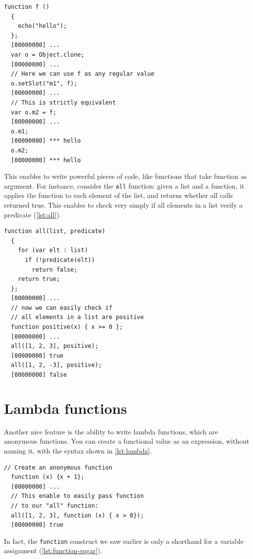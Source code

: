 \documentclass[openright,twoside,12pt]{report}
\newcommand{\lst}[1]{\autoref{lst:#1}}
\begin{document}
\begin{lstlisting}[caption=First class functions,
  label=lst:first-class-functions]
  function f ()
  {
    echo("hello");
  };
  [00000000] ...
  var o = Object.clone;
  [00000000] ...
  // Here we can use f as any regular value
  o.setSlot("m1", f);
  [00000000] ...
  // This is strictly equivalent
  var o.m2 = f;
  [00000000] ...
  o.m1;
  [00000000] *** hello
  o.m2;
  [00000000] *** hello
\end{lstlisting}

This enables to write powerful pieces of code, like functions that
take function as argument. For instance, consider the \texttt{all}
function: given a list and a function, it applies the function to each
element of the list, and returns whether all calls returned true. This
enables to check very simply if all elements in a list verify a
predicate (\lst{all}).

\begin{lstlisting}[caption=Functional programming: the \texttt{all}
  function, label=lst:all]
  function all(list, predicate)
  {
    for (var elt : list)
      if (!predicate(elt))
        return false;
    return true;
  };
  [00000000] ...
  // now we can easily check if
  // all elements in a list are positive
  function positive(x) { x >= 0 };
  [00000000] ...
  all([1, 2, 3], positive);
  [00000000] true
  all([1, 2, -3], positive);
  [00000000] false
\end{lstlisting}

\section{Lambda functions}

Another nice feature is the ability to write lambda functions, which
are anonymous functions. You can create a functional value as an
expression, without naming it, with the syntax shown in \lst{lambda}.

\begin{lstlisting}[caption=Lambda function, label=lst:lambda]
  // Create an anonymous function
  function (x) {x + 1};
  [00000000] ...
  // This enable to easily pass function
  // to our "all" function:
  all([1, 2, 3], function (x) { x > 0});
  [00000000] true
\end{lstlisting}

In fact, the \texttt{function} construct we saw earlier is only a
shorthand for a variable assignment (\lst{function-sugar}).
\end{document}

